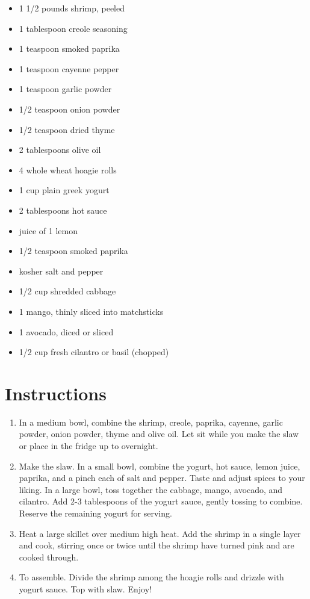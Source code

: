 \documentclass[
  letterpaper,
  DIV=11,
  numbers=noendperiod,
  titlepage=false]{scrreprt}
\providecommand{\tightlist}{%
  \setlength{\itemsep}{0pt}\setlength{\parskip}{0pt}}\usepackage{longtable,booktabs,array}
\begin{document}
\begin{itemize}
\tightlist
\item
  1 1/2 pounds shrimp, peeled
\item
  1 tablespoon creole seasoning
\item
  1 teaspoon smoked paprika
\item
  1 teaspoon cayenne pepper
\item
  1 teaspoon garlic powder
\item
  1/2 teaspoon onion powder
\item
  1/2 teaspoon dried thyme
\item
  2 tablespoons olive oil
\item
  4 whole wheat hoagie rolls
\item
  1 cup plain greek yogurt
\item
  2 tablespoons hot sauce
\item
  juice of 1 lemon
\item
  1/2 teaspoon smoked paprika
\item
  kosher salt and pepper
\item
  1/2 cup shredded cabbage
\item
  1 mango, thinly sliced into matchsticks
\item
  1 avocado, diced or sliced
\item
  1/2 cup fresh cilantro or basil (chopped)
\end{itemize}

\section{Instructions}\label{instructions-134}

\begin{enumerate}
\def\labelenumi{\arabic{enumi}.}
\tightlist
\item
  In a medium bowl, combine the shrimp, creole, paprika, cayenne, garlic
  powder, onion powder, thyme and olive oil. Let sit while you make the
  slaw or place in the fridge up to overnight.
\item
  Make the slaw. In a small bowl, combine the yogurt, hot sauce, lemon
  juice, paprika, and a pinch each of salt and pepper. Taste and adjust
  spices to your liking. In a large bowl, toss together the cabbage,
  mango, avocado, and cilantro. Add 2-3 tablespoons of the yogurt sauce,
  gently tossing to combine. Reserve the remaining yogurt for serving.
\item
  Heat a large skillet over medium high heat. Add the shrimp in a single
  layer and cook, stirring once or twice until the shrimp have turned
  pink and are cooked through.
\item
  To assemble. Divide the shrimp among the hoagie rolls and drizzle with
  yogurt sauce. Top with slaw. Enjoy!
\end{enumerate}
\end{document}
